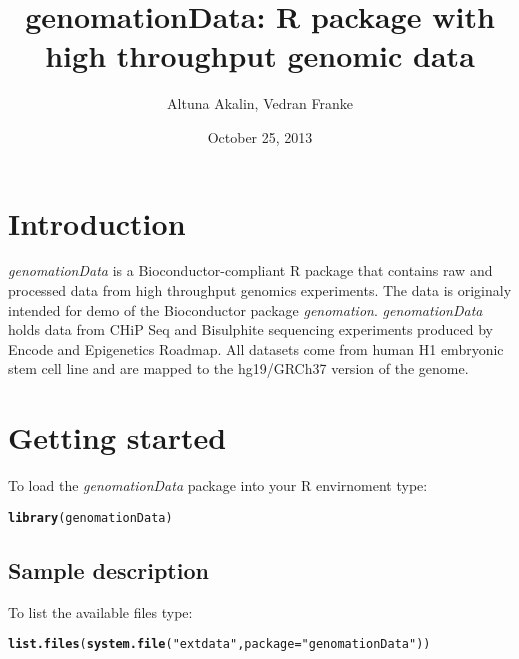 \documentclass[12pt]{article}\usepackage[]{graphicx}\usepackage[]{color}
\author{Altuna Akalin, Vedran Franke}
\title{\textsf{genomationData: R package with high throughput genomic data}}
\date{October 25, 2013}
\makeatletter
\newcommand{\hlstr}[1]{\textcolor[rgb]{0.192,0.494,0.8}{#1}}%
\newcommand{\hlstd}[1]{\textcolor[rgb]{0.345,0.345,0.345}{#1}}%
\newcommand{\hlkwc}[1]{\textcolor[rgb]{0.333,0.667,0.333}{#1}}%
\newcommand{\hlkwd}[1]{\textcolor[rgb]{0.737,0.353,0.396}{\textbf{#1}}}%
\newenvironment{kframe}{%
 \def\at@end@of@kframe{}%
 \ifinner\ifhmode%
  \def\at@end@of@kframe{\end{minipage}}%
  \begin{minipage}{\columnwidth}%
 \fi\fi%
 \def\FrameCommand##1{\hskip\@totalleftmargin \hskip-\fboxsep
 \colorbox{shadecolor}{##1}\hskip-\fboxsep
     \hskip-\linewidth \hskip-\@totalleftmargin \hskip\columnwidth}%
 \MakeFramed {\advance\hsize-\width
   \@totalleftmargin\z@ \linewidth\hsize
   \@setminipage}}%
 {\par\unskip\endMakeFramed%
 \at@end@of@kframe}
\newenvironment{knitrout}{}{} %
\newcommand{\Rpackage}[1]{{\textit{#1}}}
\makeatother
\begin{document}
\maketitle

\tableofcontents

\section{Introduction}

\Rpackage{genomationData} is a Bioconductor-compliant R package that contains 
raw and processed data from high throughput genomics experiments. The data is 
originaly intended for demo of the Bioconductor package \Rpackage{genomation}.
\Rpackage{genomationData} holds data from CHiP Seq and Bisulphite sequencing 
experiments produced by Encode and Epigenetics Roadmap. All datasets come from 
human H1 embryonic stem cell line and are mapped to the hg19/GRCh37 version of 
the genome.


\section{Getting started}

To load the \Rpackage{genomationData} package into your R envirnoment type:
\begin{knitrout}
\color{fgcolor}\begin{kframe}
\begin{alltt}
\hlkwd{library}\hlstd{(genomationData)}
\end{alltt}
\end{kframe}
\end{knitrout}


\subsection{Sample description}
To list the available files type:
\begin{knitrout}
\color{fgcolor}\begin{kframe}
\begin{alltt}
\hlkwd{list.files}\hlstd{(}\hlkwd{system.file}\hlstd{(}\hlstr{"extdata"}\hlstd{,} \hlkwc{package} \hlstd{=} \hlstr{"genomationData"}\hlstd{))}
\end{alltt}
\end{kframe}
\end{knitrout}
\end{document}
